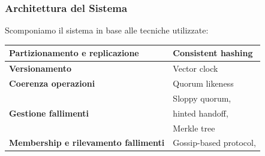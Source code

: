 \begin{frame}
  \frametitle{Architettura del Sistema}
  Scomponiamo il sistema in base alle tecniche utilizzate:
  \begin{table}[ht]
  \begin{center} 
  \begin{tabular}{| l | l |}
  \hline
  \rowcolor{lightgray} 
  \textbf{Partizionamento e replicazione} & Consistent hashing \\
  \hline
  \textbf{Versionamento}                  & Vector clock \\
  \hline
  \rowcolor{lightgray}
  \textbf{Coerenza operazioni}            & Quorum likeness \\
  \hline
  \multirow{3}{*}{\textbf{Gestione fallimenti}}
                                          & Sloppy quorum, \\
                                          & hinted handoff, \\
                                          & Merkle tree \\ 
  \hline
  \rowcolor{lightgray}
  \textbf{Membership e rilevamento fallimenti}  & Gossip-based protocol, \\ 
  \hline
  \end{tabular}
  \end{center}
  \end{table}
\end{frame}


